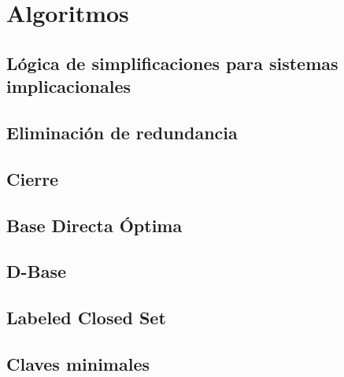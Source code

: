 \section{Algoritmos}

\subsection{L\'ogica de simplificaciones para sistemas implicacionales}

 
\newpage

\subsection{Eliminaci\'on de redundancia}

 
\newpage

\subsection{Cierre}

 
\newpage

\subsection{Base Directa \'Optima}

 
\newpage

\subsection{D-Base}

 
\newpage

\subsection{Labeled Closed Set}

 
\newpage

\subsection{Claves minimales}

 

\newpage
\thispagestyle{empty}
\mbox{}

\newpage